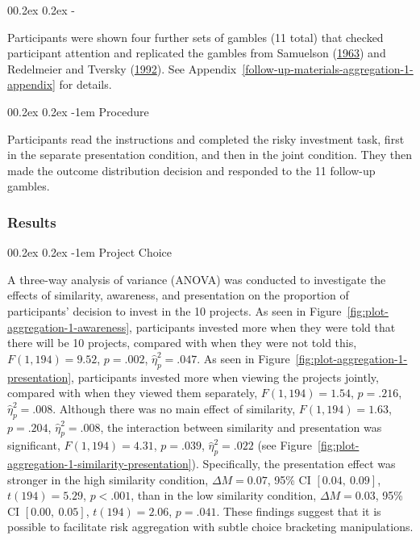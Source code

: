 \documentclass[
  english,
  man, donotrepeattitle,floatsintext]{apa7}
\makeatletter
\let\oldparagraph\paragraph
\renewcommand{\paragraph}[1]{\oldparagraph{#1}\mbox{}}
\let\oldsubparagraph\subparagraph
\renewcommand{\subparagraph}[1]{\oldsubparagraph{#1}\mbox{}}
\renewcommand{\paragraph}{\@startsection{paragraph}{4}{\parindent}%
  {0\baselineskip \@plus 0.2ex \@minus 0.2ex}%
  {-1em}%
  {\normalfont\normalsize\bfseries\itshape\typesectitle}}
\renewcommand{\subparagraph}[1]{\@startsection{subparagraph}{5}{1em}%
  {0\baselineskip \@plus 0.2ex \@minus 0.2ex}%
  {-\z@\relax}%
  {\normalfont\normalsize\itshape\hspace{\parindent}{#1}\textit{\addperi}}{\relax}}
\theoremstyle{definition}
\theoremstyle{definition}
\theoremstyle{definition}
\theoremstyle{definition}
\theoremstyle{remark}
\makeatother
\begin{document}
\hypertarget{follow-up-gambles}{%
\subparagraph{Follow-up Gambles}\label{follow-up-gambles}}

Participants were shown four further sets of gambles (11 total) that checked
participant attention and replicated the gambles from Samuelson (\protect\hyperlink{ref-samuelson1963}{1963}) and
Redelmeier and Tversky (\protect\hyperlink{ref-redelmeier1992}{1992}). See Appendix~\ref{follow-up-materials-aggregation-1-appendix}
for details.

\hypertarget{procedure}{%
\paragraph{Procedure}\label{procedure}}

Participants read the instructions and completed the risky investment task,
first in the separate presentation condition, and then in the joint condition.
They then made the outcome distribution decision and responded to the 11
follow-up gambles.

\hypertarget{results-aggregation-1}{%
\subsubsection{Results}\label{results-aggregation-1}}

\hypertarget{project-choice}{%
\paragraph{Project Choice}\label{project-choice}}

A three-way analysis of variance (ANOVA) was conducted to investigate the
effects of similarity, awareness, and presentation on the proportion of
participants' decision to invest in the 10 projects. As seen in
Figure~\ref{fig:plot-aggregation-1-awareness}, participants invested more when
they were told that there will be 10 projects, compared with when they were not
told this, \(F(1, 194) = 9.52\), \(p = .002\), \(\hat{\eta}^2_p = .047\). As seen in
Figure~\ref{fig:plot-aggregation-1-presentation}, participants invested more
when viewing the projects jointly, compared with when they viewed them separately,
\(F(1, 194) = 1.54\), \(p = .216\), \(\hat{\eta}^2_p = .008\). Although there was no main effect of
similarity, \(F(1, 194) = 1.63\), \(p = .204\), \(\hat{\eta}^2_p = .008\), the interaction between
similarity and presentation was significant,
\(F(1, 194) = 4.31\), \(p = .039\), \(\hat{\eta}^2_p = .022\) (see
Figure~\ref{fig:plot-aggregation-1-similarity-presentation}). Specifically, the
presentation effect was stronger in the high similarity condition,
\(\Delta M = 0.07\), 95\% CI \([0.04,~0.09]\), \(t(194) = 5.29\), \(p < .001\), than in the low similarity
condition, \(\Delta M = 0.03\), 95\% CI \([0.00,~0.05]\), \(t(194) = 2.06\), \(p = .041\). These findings
suggest that it is possible to facilitate risk aggregation with subtle choice
bracketing manipulations.
\end{document}
